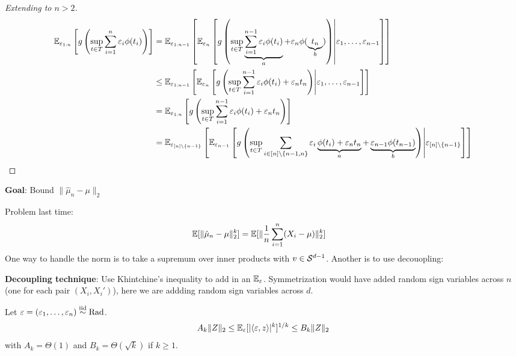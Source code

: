 \begin{proof}[Extending to $n > 2$]
  \begin{align}
    \mathbb{E}_{\varepsilon_{1:n}}\left[
      g \left(
        \sup_{t \in T} \sum_{i=1}^n \varepsilon_i \phi(t_i)
      \right)
    \right]
    &=
    \mathbb{E}_{\varepsilon_{1:n-1}} \left[
      \mathbb{E}_{\varepsilon_{n}}\left[
        g \left(
          \sup_{t \in T} \underbrace{\sum_{i=1}^{n-1} \varepsilon_i \phi(t_i)}_{a} + \varepsilon_n \phi(\underbrace{t_n}_{b})
        \right)
      \middle\vert \varepsilon_1,\ldots, \varepsilon_{n-1} \right]
    \right] \\
    &\leq
    \mathbb{E}_{\varepsilon_{1:n-1}} \left[
      \mathbb{E}_{\varepsilon_{n}}\left[
        g \left(
          \sup_{t \in T} \sum_{i=1}^{n-1} \varepsilon_i \phi(t_i) + \varepsilon_n t_n
        \right)
      \middle\vert \varepsilon_1,\ldots, \varepsilon_{n-1} \right]
    \right] \\
    &=
    \mathbb{E}_{\varepsilon_{1:n}} \left[
      g \left(
        \sup_{t \in T} \sum_{i=1}^{n-1} \varepsilon_i \phi(t_i) + \varepsilon_n t_n
      \right)
    \right] \\
    &=
    \mathbb{E}_{\varepsilon_{[n] \setminus \{n-1\}}} \left[
        \mathbb{E}_{\varepsilon_{n-1}}\left[
          g \left(
            \sup_{t \in T} \sum_{i \in [n] \setminus \{n-1, n\}} \varepsilon_i \underbrace{\phi(t_i) + \varepsilon_n t_n }_{a}
            + \underbrace{\varepsilon_{n-1} \phi(t_{n-1})}_{b}
          \right)
        \middle\lvert \varepsilon_{[n] \setminus \{n-1\}} \right]
      \right]
  \end{align}
\end{proof}


\textbf{Goal}: Bound $\|\hat{\mu}_n - \mu\|_2$

Problem last time:
\begin{align}
  \mathbb{E}[ \|\hat{\mu}_n - \mu\|_2^k ]
  &= \mathbb{E}[ \| \frac{1}{n} \sum_{i=1}^n (X_i - \mu)\|_2^k ]
\end{align}
One way to handle the norm is to take a supremum over inner products with
$v \in \mathcal{S}^{d-1}$. Another is to use decouopling:

\textbf{Decoupling technique}: Use Khintchine's inequality to add in
an $\mathbb{E}_\varepsilon$. Symmetrization would have added random sign variables across
$n$ (one for each pair $(X_i, X_i')$), here we are addding random sign
variables across $d$.

\begin{lemma}
  Let $\varepsilon = (\varepsilon_1, \ldots, \varepsilon_n) \overset{\text{iid}}{\sim} \text{Rad}$.
  \begin{align}
    A_k \|Z\|_2 \leq \mathbb{E}_\varepsilon[\lvert \braket{\varepsilon,z}\rvert^k]^{1/k} \leq B_k \|Z\|_2
  \end{align}
  with $A_k = \Theta(1)$ and $B_k = \Theta(\sqrt{k})$ if $k \geq 1$.
\end{lemma}

